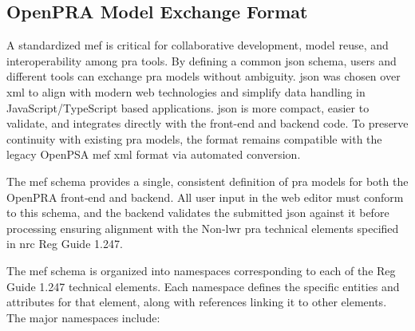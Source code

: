 \subsection{OpenPRA Model Exchange Format}

A standardized \acrfull{mef} is critical for collaborative development, model reuse, and interoperability among \acrshort{pra} tools.  By defining a common \acrshort{json} schema, users and different tools can exchange \acrshort{pra} models without ambiguity.  \acrshort{json} was chosen over \acrshort{xml} to align with modern web technologies and simplify data handling in JavaScript/TypeScript based applications. \acrshort{json} is more compact, easier to validate, and integrates directly with the front-end and backend code.  To preserve continuity with existing \acrshort{pra} models, the format remains compatible with the legacy OpenPSA \acrshort{mef} \acrshort{xml} format via automated conversion.

The \acrshort{mef} schema provides a single, consistent definition of \acrshort{pra} models for both the OpenPRA front‑end and backend. All user input in the web editor must conform to this schema, and the backend validates the submitted \acrshort{json} against it before processing ensuring alignment with the Non‑\acrshort{lwr} \acrshort{pra} technical elements specified in \acrshort{nrc} Reg Guide 1.247.

The \acrshort{mef} schema is organized into namespaces corresponding to each of the Reg Guide 1.247 technical elements.  Each namespace defines the specific entities and attributes for that element, along with references linking it to other elements. The major namespaces include:

